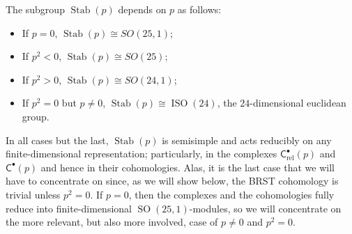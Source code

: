 \documentclass[11pt,reqno,a4paper,final]{amsart}
\theoremstyle{plain}
\theoremstyle{definition}
\newcommand{\sC}{\mathsf{C}}
\newcommand{\Crel}{\mathsf{C}_{\mathrm{rel}}} %
\newcommand{\Stab}{\operatorname{Stab}}
\newcommand{\1}{\mathbb{1}}
\newcommand{\ISO}{\operatorname{ISO}}
\newcommand{\SO}{\operatorname{SO}}
\numberwithin{equation}{section}
\begin{document}
 The subgroup  $\Stab(p)$ depends on $p$ as follows:
\begin{itemize}
\item If $p=0$, $\Stab(p) \cong SO(25,1)$;
\item If $p^2 < 0$, $\Stab(p) \cong SO(25)$;
\item If $p^2 > 0$, $\Stab(p) \cong SO(24,1)$;
\item If $p^2 = 0$ but $p \neq 0$, $\Stab(p) \cong \ISO(24)$, the
  $24$-dimensional euclidean group.
\end{itemize}
In all cases but the last, $\Stab(p)$ is semisimple and acts reducibly
on any finite-dimensional representation; particularly, in the
complexes $\Crel^\bullet(p)$ and $\sC^\bullet(p)$ and hence in their
cohomologies.  Alas, it is the last case that we will have to
concentrate on since, as we will show below, the BRST cohomology is
trivial unless $p^2 = 0$.  If $p=0$, then the complexes and the
cohomologies fully reduce into finite-dimensional $\SO(25,1)$-modules,
so we will concentrate on the more relevant, but also more involved,
case of $p\neq 0$ and $p^2 = 0$.
\end{document}
